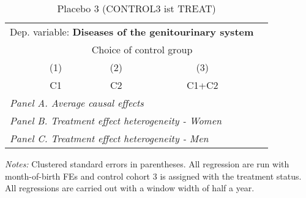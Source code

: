  \begin{table}[H] \centering \begin{threeparttable} \caption{Placebo 3 (CONTROL3 ist TREAT) } {\def\sym#1{\ifmmode^{#1}\else\(^{#1}\)\fi} \begin{tabular}{l*{4}{c}} \toprule \multicolumn{4}{l}{Dep. variable: \textbf{Diseases of the genitourinary system}} \\ & \multicolumn{3}{c}{Choice of control group} \\ \cmidrule(lr){2-4}
            &\multicolumn{1}{c}{(1)}&\multicolumn{1}{c}{(2)}&\multicolumn{1}{c}{(3)}\\
            &\multicolumn{1}{c}{C1}&\multicolumn{1}{c}{C2}&\multicolumn{1}{c}{C1+C2}\\
\midrule
 \multicolumn{4}{l}{\emph{Panel A. Average causal effects}} \\      \midrule\multicolumn{4}{l}{\emph{Panel B. Treatment effect heterogeneity - Women}} \\      \midrule\multicolumn{4}{l}{\emph{Panel C. Treatment effect heterogeneity - Men}} \\      
\bottomrule \end{tabular} } \begin{tablenotes} \item \scriptsize \emph{Notes:} Clustered standard errors in parentheses. All regression are run with month-of-birth FEs and control cohort 3 is assigned with the treatment status. All regressions are carried out with a window width of half a year. \end{tablenotes} \end{threeparttable} \end{table} 
